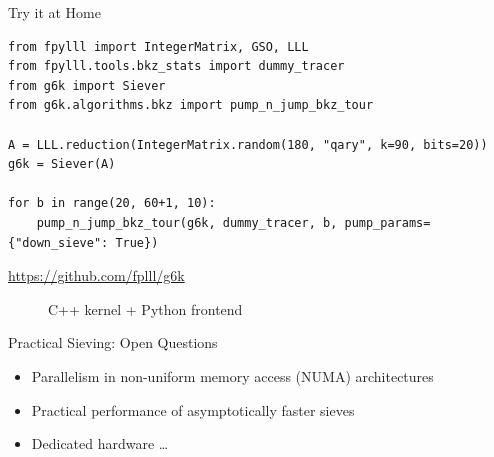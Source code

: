 \documentclass[xcolor=table,10pt,aspectratio=169]{beamer}
\begin{document}
\begin{frame}[label={sec:org73697b9},fragile]{Try it at Home}
 \lstset{language=sage,label= ,caption= ,captionpos=b,numbers=none}
\begin{lstlisting}
from fpylll import IntegerMatrix, GSO, LLL
from fpylll.tools.bkz_stats import dummy_tracer
from g6k import Siever
from g6k.algorithms.bkz import pump_n_jump_bkz_tour

A = LLL.reduction(IntegerMatrix.random(180, "qary", k=90, bits=20))
g6k = Siever(A)

for b in range(20, 60+1, 10):
    pump_n_jump_bkz_tour(g6k, dummy_tracer, b, pump_params={"down_sieve": True})
\end{lstlisting}

\begin{description}
\item[{\url{https://github.com/fplll/g6k}}] C++ kernel + Python frontend
\end{description}
\end{frame}

\begin{frame}[label={sec:orgfa1fdea}]{Practical Sieving: Open Questions}
\begin{itemize}
\item Parallelism in non-uniform memory access (NUMA) architectures
\item Practical performance of asymptotically faster sieves
\item Dedicated hardware …
\end{itemize}
\end{frame}
\end{document}
